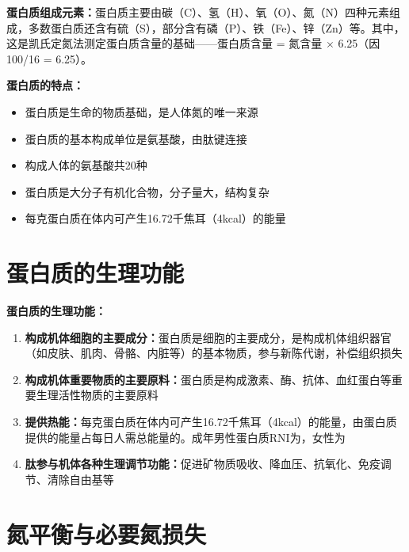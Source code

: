 \begin{tipbox}
\textbf{蛋白质组成元素：}蛋白质主要由碳（C）、氢（H）、氧（O）、氮（N）四种元素组成，多数蛋白质还含有硫（S），部分含有磷（P）、铁（Fe）、锌（Zn）等。其中，这是凯氏定氮法测定蛋白质含量的基础——蛋白质含量 = 氮含量 $\times$ 6.25（因100/16 = 6.25）。

\textbf{蛋白质的特点：}
\begin{itemize}[leftmargin=*]
    \item 蛋白质是生命的物质基础，是人体氮的唯一来源
    \item 蛋白质的基本构成单位是氨基酸，由肽键连接
    \item 构成人体的氨基酸共20种
    \item 蛋白质是大分子有机化合物，分子量大，结构复杂
    \item 每克蛋白质在体内可产生16.72千焦耳（4kcal）的能量
\end{itemize}
\end{tipbox}

\section{蛋白质的生理功能}

\begin{defbox}
\textbf{蛋白质的生理功能：}
\begin{enumerate}[leftmargin=*]
    \item \textbf{构成机体细胞的主要成分：}蛋白质是细胞的主要成分，是构成机体组织器官（如皮肤、肌肉、骨骼、内脏等）的基本物质，参与新陈代谢，补偿组织损失
    \item \textbf{构成机体重要物质的主要原料：}蛋白质是构成激素、酶、抗体、血红蛋白等重要生理活性物质的主要原料
    \item \textbf{提供热能：}每克蛋白质在体内可产生16.72千焦耳（4kcal）的能量，由蛋白质提供的能量占每日人需总能量的。成年男性蛋白质RNI为，女性为
    \item \textbf{肽参与机体各种生理调节功能：}促进矿物质吸收、降血压、抗氧化、免疫调节、清除自由基等 %
\end{enumerate}
\end{defbox}

\section{氮平衡与必要氮损失}

